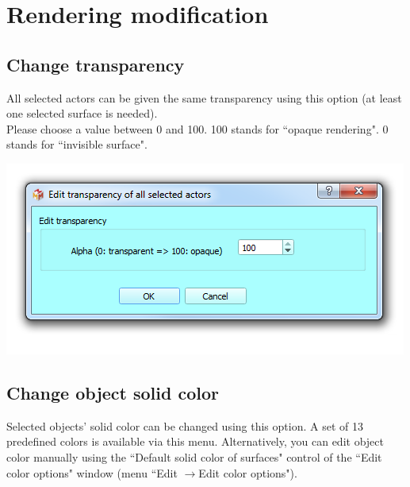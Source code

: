 \section{Rendering modification}



\subsection{Change transparency}
\noindent
\begin{minipage}{0.4\textwidth}
All selected actors can be given the same transparency using this option (at least one selected surface is needed).\\
Please choose a value between 0 and 100. 100 stands for ``opaque rendering". 0 stands for ``invisible surface".\\


\end{minipage}    
\begin{minipage}{0.6\textwidth}\centering
  \includegraphics[scale=0.5]{images/09/rendering/transparency.png}
 \end{minipage} 
\noindent





\subsection{Change object solid color}
Selected objects' solid color can be changed using this option. A set of 13 predefined colors is available via this menu. Alternatively, you can edit object color manually using the ``Default solid color of surfaces" control of the ``Edit color options" window (menu ``Edit $\rightarrow$Edit color options").





